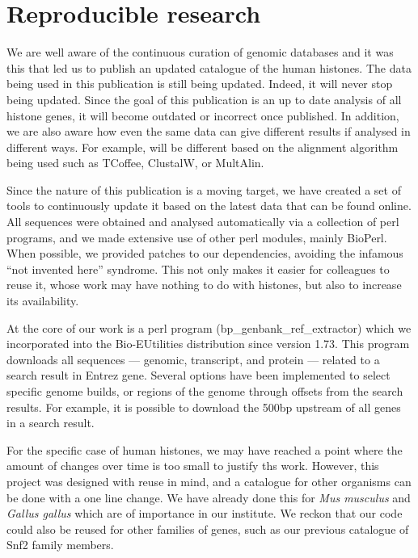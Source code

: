 \section{Reproducible research}
\label{sec:reproducible}

  We are well aware of the continuous curation of genomic databases and it was this
  that led us to publish an updated catalogue of the human histones. The data being
  used in this publication is still being updated. Indeed, it will never stop being
  updated. Since the goal of this publication is an up to date analysis of all histone
  genes, it will become outdated or incorrect once published.
  In addition,
  we are also aware how even the same data can give different results if analysed
  in different ways. For example,  will be different based
  on the alignment algorithm being used such as TCoffee\citep{tcoffee2000},
  ClustalW\citep{clustalw2}, or MultAlin\citep{multalin1988}.

  Since the nature of this publication is a moving target, we have created a set of tools
  to continuously update it based on the latest data that can be found online.
  All sequences were obtained and analysed automatically via a collection of perl
  programs, and we made extensive use of other perl modules, mainly BioPerl\citep{bioperl}.
  When possible, we provided patches to our dependencies, avoiding the infamous
  ``not invented here'' syndrome. This not only makes it easier for colleagues to
  reuse it, whose work may have nothing to do with histones, but also to
  increase its availability.

  At the core of our work is a perl program (bp\_genbank\_ref\_extractor) which
  we incorporated into the Bio-EUtilities distribution since version 1.73. This program
  downloads all sequences --- genomic, transcript, and protein --- related to a search
  result in Entrez gene. Several options have been implemented to select specific genome
  builds, or regions of the genome through offsets from the search results. For example,
  it is possible to download the 500bp upstream of all genes in a search result.


  For the specific case of human histones, we may have reached a point where the amount
  of changes over time is too small to justify ths work. However, this project was
  designed with reuse in mind, and a catalogue for other organisms can be done with a
  one line change. We have already done this for \textit{Mus musculus} and
  \textit{Gallus gallus} which are of importance in our institute.
  We reckon that our code could also be reused for other families of genes, such as our
  previous catalogue of Snf2 family members\citep{andrew-snf2-catalogue}.

